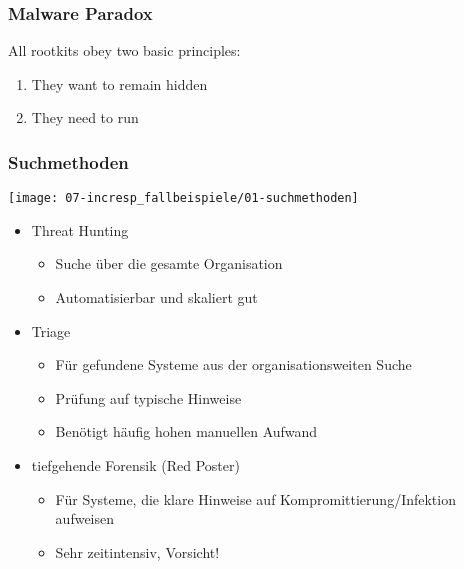 \subsubsection{Malware Paradox}
All rootkits obey two basic principles:
\begin{enumerate}
    \item They want to remain hidden
    \item They need to run
\end{enumerate}

\subsubsection{Suchmethoden}
\begin{center}
    \texttt{[image: 07-incresp\_fallbeispiele/01-suchmethoden]}
\end{center}

\begin{itemize}
    \item Threat Hunting
    \begin{itemize}
        \item Suche über die gesamte Organisation
        \item Automatisierbar und skaliert gut
    \end{itemize}
    \item Triage
    \begin{itemize}
        \item Für gefundene Systeme aus der organisationsweiten Suche
        \item Prüfung auf typische Hinweise
        \item Benötigt häufig hohen manuellen Aufwand
    \end{itemize}
    \item tiefgehende Forensik (Red Poster)
    \begin{itemize}
        \item Für Systeme, die klare Hinweise auf Kompromittierung/Infektion aufweisen
        \item Sehr zeitintensiv, Vorsicht!
    \end{itemize}
\end{itemize}

